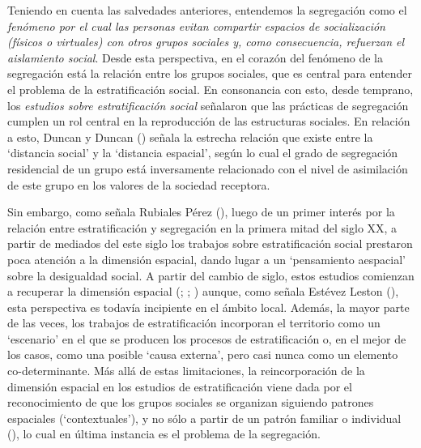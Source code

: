 \documentclass[
  spanish,
  a4paper,%
  chapterprefix=true,%
  DIV=calc,%
  twoside]{scrbook}%
\begin{document}
Teniendo en cuenta las salvedades anteriores, entendemos la segregación
como el \emph{fenómeno por el cual las personas evitan compartir espacios de
socialización (físicos o virtuales) con otros grupos sociales y, como
consecuencia, refuerzan el aislamiento social}. Desde esta perspectiva,
en el corazón del fenómeno de la segregación está la relación entre los
grupos sociales, que es central para entender el problema de la
estratificación social. En consonancia con esto, desde temprano, los
\emph{estudios sobre estratificación social} señalaron que las prácticas de
segregación cumplen un rol central en la reproducción de las estructuras
sociales. En relación a esto, Duncan y Duncan () señala la estrecha relación
que existe entre la `distancia social' y la `distancia espacial', según
lo cual el grado de segregación residencial de un grupo está
inversamente relacionado con el nivel de asimilación de este grupo en
los valores de la sociedad receptora.

Sin embargo, como señala Rubiales Pérez (), luego de un primer
interés por la relación entre estratificación y segregación en la
primera mitad del siglo XX, a partir de mediados del este siglo los
trabajos sobre estratificación social prestaron poca atención a la
dimensión espacial, dando lugar a un `pensamiento aespacial' sobre la
desigualdad social. A partir del cambio de siglo, estos estudios
comienzan a recuperar la dimensión espacial (; ; ) aunque, como señala Estévez Leston (), esta perspectiva es
todavía incipiente en el ámbito local. Además, la mayor parte de las
veces, los trabajos de estratificación incorporan el territorio como un
`escenario' en el que se producen los procesos de estratificación o, en
el mejor de los casos, como una posible `causa externa', pero casi nunca
como un elemento co-determinante. Más allá de estas limitaciones, la
reincorporación de la dimensión espacial en los estudios de
estratificación viene dada por el reconocimiento de que los grupos
sociales se organizan siguiendo patrones espaciales (`contextuales'), y
no sólo a partir de un patrón familiar o individual (), lo
cual en última instancia es el problema de la segregación.
\end{document}
